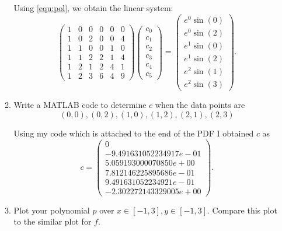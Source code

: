 \documentclass[a4paper,12pt]{article}
\newcommand{\pmat}[1]{\begin{pmatrix} #1 \end{pmatrix}}
\begin{document}
\begin{enumerate}[label = \arabic*)]
\begin{enumerate}[label = (\roman*)]
			Using \eqref{equ:pol}, we obtain the linear system:
			\[
				\pmat{
					1 & 0 & 0 & 0 & 0 & 0 \\
					1 & 0 & 2 & 0 & 0 & 4 \\
					1 & 1 & 0 & 0 & 1 & 0 \\
					1 & 1 & 2 & 2 & 1 & 4 \\
					1 & 2 & 1 & 2 & 4 & 1 \\
					1 & 2 & 3 & 6 & 4 & 9
				} \pmat{
					c_0 \\ c_1 \\ c_2 \\ c_3 \\ c_4 \\ c_5 
				} = \pmat{e^0 \sin(0) \\ e^0 \sin(2) \\ e^1 \sin(0) \\ e^1 \sin(2) \\ e^2 \sin(1) \\ e^2 \sin(3)}.
			\]
			
			\item Write a MATLAB code to determine $ c $ when the data points are
			\[
				(0,0), (0,2), (1,0), (1,2), (2,1), (2,3)
			\]
			
			Using my code which is attached to the end of the PDF I obtained $ c $ as 
			\[
				c =
				\pmat{
					0 \\
					-9.491631052234917e-01 \\
					5.059193000070850e+00 \\
					7.812146225895686e-01 \\
					9.491631052234921e-01 \\
					-2.302272143329005e+00
				}.
			\]
			
			\item Plot your polynomial $ p $ over $ x \in [-1,3], y \in [-1,3] $. Compare this plot to the similar plot for $ f $.
			

\end{enumerate}
\end{enumerate}
\end{document}
